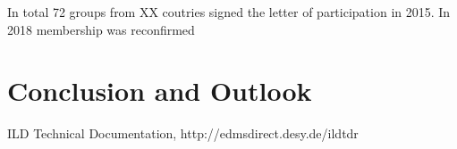 \documentclass[%
 amsmath,amssymb,
 aps,
]{revtex4-1}
\begin{document}
In total 72 groups from XX coutries signed the letter of participation in 2015. In 2018 membership was reconfirmed 



\section{Conclusion and Outlook}

\begin{thebibliography}{}
 ILD Technical Documentation, http://edmsdirect.desy.de/ildtdr

\end{thebibliography}
\end{document}
